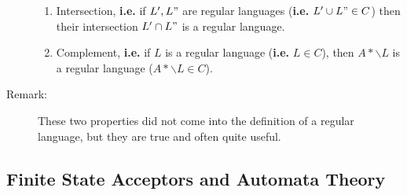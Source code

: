 \documentclass[10pt]{article}
\begin{document}
\begin{description}
		\begin{enumerate}
			\item Intersection, \textbf{i.e.} if $L', L"$ are regular languages (\textbf{i.e.} $L' \cup L" \in C$) then their intersection $L' \cap L"$ is a regular language.
			\item Complement, \textbf{i.e.} if $L$ is a regular language (\textbf{i.e.} $L \in C$), then $A* \backslash L$ is a regular language ($A* \backslash L \in C$).
		\end{enumerate}
		\item[Remark:] These two properties did not come into the definition of a regular language, but they are true and often quite useful.
	\end{description}
	
	\subsection{Finite State Acceptors and Automata Theory}
\end{document}
